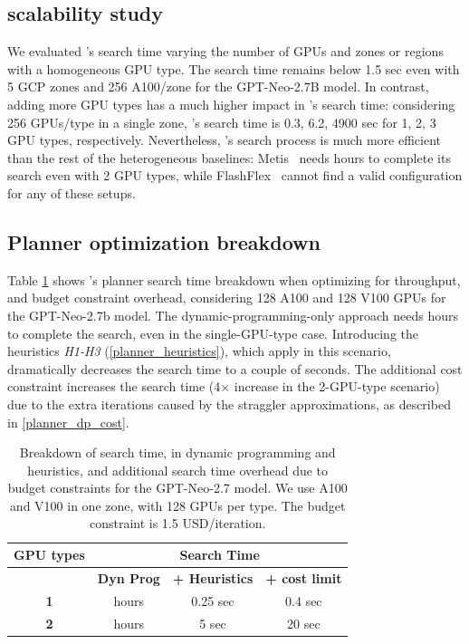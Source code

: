 \subsection{\sailor scalability study}

We evaluated \sailor's search time varying the number of GPUs and zones or regions with a homogeneous GPU type. The search time remains below 1.5 sec even with 5 GCP zones and 256 A100/zone for the GPT-Neo-2.7B model. In contrast, adding more GPU types has a much higher impact in \sailor's search time: considering 256 GPUs/type in a single zone, \sailor's search time is 0.3, 6.2, 4900 sec for 1, 2, 3 GPU types, respectively. Nevertheless, \sailor's search process is much more efficient than the rest of the heterogeneous baselines:  Metis~\cite{Um24Metis} needs hours to complete its search even with 2 GPU types, while FlashFlex~\cite{yan2024flashflex} cannot find a valid configuration for any of these setups.

\subsection{\sailor Planner optimization breakdown} 

Table \ref{table:search_times_breakdown} shows \sailor's planner search time breakdown when optimizing for throughput, and budget constraint overhead, considering 128 A100 and 128 V100 GPUs for the GPT-Neo-2.7b model. The dynamic-programming-only approach needs hours to complete the search, even in the single-GPU-type case. Introducing the heuristics \textit{H1-H3} (\ref{planner_heuristics}), which apply in this scenario, dramatically decreases the search time to a couple of seconds.  The additional cost constraint increases the search time (4$\times$ increase in the 2-GPU-type scenario) due to the extra iterations caused by the straggler approximations, as described in \ref{planner_dp_cost}.

\begin{table}[tp!]
\centering
\begin{tabular}{|c|c|c|c|}
\hline
\textbf{GPU types} & \multicolumn{3}{c|}{\textbf{Search Time}} \\
\hline
& \textbf{Dyn Prog} & \textbf{+ Heuristics} & \textbf{+ cost limit} \\
\hline
\textbf{1} & hours & 0.25 sec & 0.4 sec \\
\hline
\textbf{2} & hours & 5 sec & 20 sec \\
\hline
\end{tabular}
\caption{Breakdown of search time, in dynamic programming and heuristics, and additional search time overhead due to budget constraints for the GPT-Neo-2.7 model. We use A100 and V100 in one zone, with 128 GPUs per type. The budget constraint is 1.5 USD/iteration.}
\vspace{-0.5cm}
\label{table:search_times_breakdown}
\end{table}


